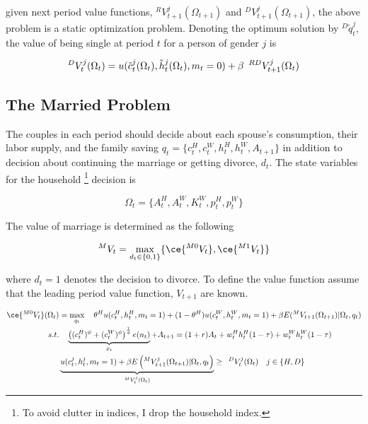 given next period value functions, $^{R}V_{t+1}^j (\Omega_{t+1})$ and $^{D}V_{t+1}^j (\Omega_{t+1})$, the above problem is a static optimization problem. Denoting the optimum solution by $^{D}\tilde q_t^j$, the value of being single at period $t$ for a person of gender $j$ is

\begin{equation*}
^{D}V_t^j (\Omega_t) = u(\tilde c_t^j (\Omega_t), \tilde h_t^j(\Omega_t), m_t = 0) + \beta \enskip ^{RD}V^j_{t+1} (\Omega_t)
\end{equation*}


\subsection{The Married Problem}

The couples in each period should decide about each spouse's consumption, their labor supply, and the family saving $q_t = \{c_t^H, c_t^W, h_t^H, h_t^W,A_{t+1}\}$ in addition to decision about continuing the marriage or getting divorce, $d_t$. The state variables for the household \footnote{ To avoid clutter in indices, I drop the household index.} decision is 

\begin{equation*}
\Omega_t = \{ A_t^H, A_t^W, K_t^W, p_t^H, p_t^W  \} 
\end{equation*}

The value of marriage is determined as the following 

\begin{equation*}
^{M}V_t = \max_{d_t \in \{0,1\}} \{ \ce{^{M0}V_t}, \ce{^{M1}V_t} \}
\end{equation*}

where $d_t = 1$ denotes the decision to divorce. To define the value function assume that the leading period value function, $V_{t+1}$ are known. 

\begin{align}
\ce{^{M0}V_t}(\Omega_t)  &= \max_{q_t} \quad  \theta^H u(c_t^H, h_t^H, m_t =1) + (1 - \theta^H) u(c_t^W, h_t^W, m_t = 1) + \beta E(^MV_{t+1} (\Omega_{t+1})| \Omega_t, q_t) \nonumber \\
s.t. & \quad  \underbrace{\left ((c_t^H )^\phi + (c_t^W )^\phi  \right )^{\frac{1}{\phi}} e(n_t)}_{x_t} + A_{t+1} = (1+r) A_t + w_t^H h_t^H (1- \tau) + w_t^W h_t^W (1 - \tau) \nonumber \\
& \underbrace{u(c_t^j, h_t^j, m_t = 1) + \beta E \left (^MV^j_{t+1}(\Omega_{t+1}) | \Omega_t, q_t \right )}_{^{M}V_t^j (\Omega_t)}  \geq \enskip  ^{D}V_{t}^j (\Omega_t)\quad j \in \{ H, D\} \label{participation}
\end{align}


